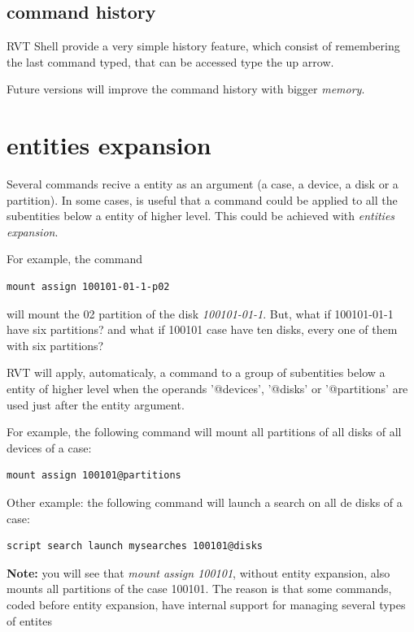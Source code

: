 \documentclass[a4paper,11pt,oneside]{report}
\begin{document}
\subsection{command history}

RVT Shell provide a very simple history feature, which consist of remembering the last command typed, that can be accessed type the up arrow.

Future versions will improve the command history with bigger \emph{memory}.






\section{entities expansion}

Several commands recive a entity as an argument (a case, a device, a disk or a partition).  In some cases, is useful that a command could be applied to all the subentities below a entity of higher level. This could be achieved with \emph{entities expansion}.

For example, the command 

\begin{verbatim}
mount assign 100101-01-1-p02
\end{verbatim}

 will mount the 02 partition of the disk \emph{100101-01-1}.  But, what if 100101-01-1 have six partitions? and what if 100101 case have ten disks, every one of them with six partitions?

RVT will apply, automaticaly, a command to a group of subentities below a entity of higher level when the operands '@devices', '@disks' or '@partitions' are used just after the entity argument.

For example, the following command will mount all partitions of all disks of all devices of a case:

\begin{verbatim}
mount assign 100101@partitions
\end{verbatim}

Other example: the following command will launch a search on all de disks of a case:

\begin{verbatim}
script search launch mysearches 100101@disks
\end{verbatim}


\textbf{Note:} you will see that \emph{mount assign 100101}, without entity expansion, also mounts all partitions of the case 100101. The reason is that some commands, coded before entity expansion, have internal support for managing several types of entites
\end{document}
